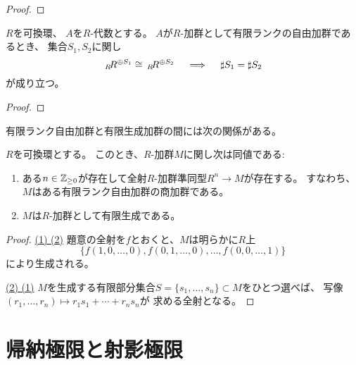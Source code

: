 \documentclass[report]{jlreq}
\begin{document}
\begin{proof}
    \TODO{}
\end{proof}

\begin{corollary}
    $R$を可換環、
    $A$を$R$-代数とする。
    $A$が$R$-加群として有限ランクの自由加群であるとき、
    集合$S_1, S_2$に関し
    \begin{equation}
        \,{}_{R}\! R^{\oplus S_1} \cong \,{}_{R}\! R^{\oplus S_2}
        \quad \implies \quad
        \sharp S_1 = \sharp S_2
    \end{equation}
    が成り立つ。
\end{corollary}

\begin{proof}
    \TODO{}
\end{proof}

有限ランク自由加群と有限生成加群の間には次の関係がある。

\begin{theorem}[有限ランク自由加群と有限生成加群の関係]
    $R$を可換環とする。
    このとき、$R$-加群$M$に関し次は同値である:
    \begin{enumerate}
        \item ある$n \in \mathbb{Z}_{\ge 0}$が存在して全射$R$-加群準同型$R^n \to M$が存在する。
            すなわち、$M$はある有限ランク自由加群の商加群である。
        \item $M$は$R$-加群として有限生成である。
    \end{enumerate}
\end{theorem}

\begin{proof}
    \uline{(1) \Rightarrow (2)} \quad
    題意の全射を$f$とおくと、$M$は明らかに$R$上
    \begin{equation}
        \{ f(1, 0, \dots, 0), f(0, 1, \dots, 0), \dots, f(0, 0, \dots, 1) \}
    \end{equation}
    により生成される。

    \uline{(2) \Rightarrow (1)} \quad
    $M$を生成する有限部分集合$S = \{ s_1, \dots, s_n \} \subset M$をひとつ選べば、
    写像$(r_1, \dots, r_n) \mapsto r_1 s_1 + \cdots + r_n s_n$が
    求める全射となる。
\end{proof}



%
\section{帰納極限と射影極限}
\end{document}
